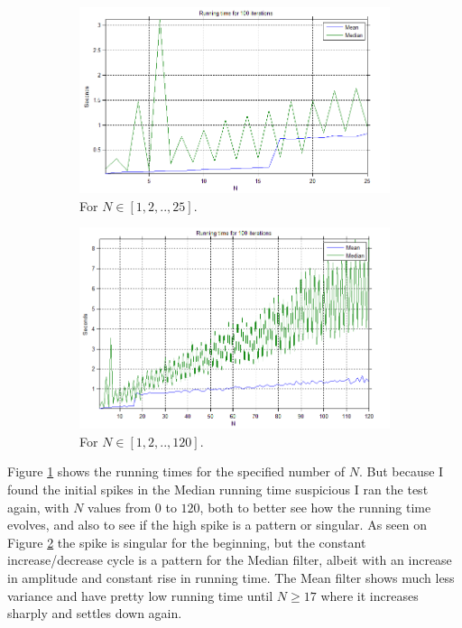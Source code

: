 \begin{figure}
        \centering
        \begin{subfigure}[b]{0.9\textwidth}
                \includegraphics[width=\textwidth]{img/2_3_2.png}
                \caption{For $N \in [1,2,..,25]$.}
                \label{fig:2_3_21}
        \end{subfigure}%

        \begin{subfigure}[b]{0.9\textwidth}
                \includegraphics[width=\textwidth]{img/2_3_3.png}
                \caption{For $N \in [1,2,..,120]$.}
                \label{fig:2_3_22}
        \end{subfigure}
    \label{fig:2_3_2}
    \caption{}
\end{figure}

Figure \ref{fig:2_3_21} shows the running times for the specified number of
$N$. But because I found the initial spikes in the Median running time
suspicious I ran the test again, with $N$ values from $0$ to $120$, both to
better see how the running time evolves, and also to see if the high spike is a
pattern or singular. As seen on Figure \ref{fig:2_3_22} the spike is singular
for the beginning, but the constant increase/decrease cycle is a pattern for the
Median filter, albeit with an increase in amplitude and constant rise in running
time. The Mean filter shows much less variance and have pretty low running time
until $N \geq 17$ where it increases sharply and settles down again.



